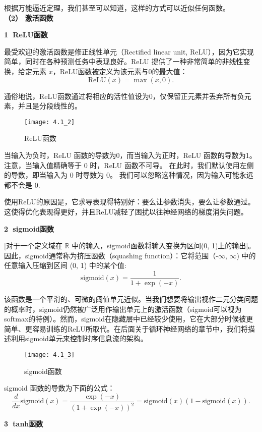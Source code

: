 \documentclass[UTF8]{ctexart}
\begin{document}
    根据万能逼近定理，我们甚至可以知道，这样的方式可以近似任何函数。\\
	
	\textbf{（2） 激活函数}
	
	\textbf{\textcircled{1} ReLU函数}
	
	最受欢迎的激活函数是修正线性单元（Rectified linear unit, ReLU），因为它实现简单，同时在各种预测任务中表现良好。ReLU 提供了一种非常简单的非线性变换，给定元素 $ x $，ReLU函数被定义为该元素与0的最大值：
	$$
	\text{ReLU}(x) = \max(x, 0).
	$$
	
	通俗地说，ReLU函数通过将相应的活性值设为0，仅保留正元素并丢弃所有负元素，并且是分段线性的。
	
	\begin{figure}[H]
		\centering
		\texttt{[image: 4.1\_2]}
		\caption{ReLU函数}
		\label{fig:2}
	\end{figure}
	
	当输入为负时，ReLU 函数的导数为0，而当输入为正时，ReLU 函数的导数为1。 注意，当输入值精确等于 0 时，ReLU 函数不可导。 在此时，我们默认使用左侧的导数，即当输入为 0 时导数为 0。 我们可以忽略这种情况，因为输入可能永远都不会是 0.
	
	使用ReLU的原因是，它求导表现得特别好：要么让参数消失，要么让参数通过。这使得优化表现得更好，并且ReLU减轻了困扰以往神经网络的梯度消失问题。
	
	\textbf{\textcircled{2} sigmoid函数}
	
	[对于一个定义域在 $\mathbb{R}$ 中的输入，sigmoid函数将输入变换为区间(0, 1)上的输出]。因此，sigmoid通常称为挤压函数（squashing function）：它将范围（-$\infty$, $\infty$) 中的任意输入压缩到区间 (0, 1) 中的某个值:
	$$
	\text{sigmoid}(x) = \frac{1}{1 + \exp(-x)}.
	$$
	
	该函数是一个平滑的、可微的阈值单元近似。当我们想要将输出视作二元分类问题的概率时，sigmoid仍然被广泛用作输出单元上的激活函数（sigmoid可以视为softmax的特例）。然而，sigmoid在隐藏层中已经较少使用，它在大部分时候被更简单、更容易训练的ReLU所取代。在后面关于循环神经网络的章节中，我们将描述利用sigmoid单元来控制时序信息流的架构。
	\begin{figure}[H]
		\centering
		\texttt{[image: 4.1\_3]}
		\caption{sigmoid函数}
		\label{fig:3}
	\end{figure}
	
	sigmoid 函数的导数为下面的公式：
	$$
	\frac{d}{dx} \text{sigmoid}(x) = \frac{\exp(-x)}{(1 + \exp(-x))^2} = \text{sigmoid}(x) (1 - \text{sigmoid}(x)).
	$$
	
	\textbf{\textcircled{3} tanh函数}
	
\end{document}
